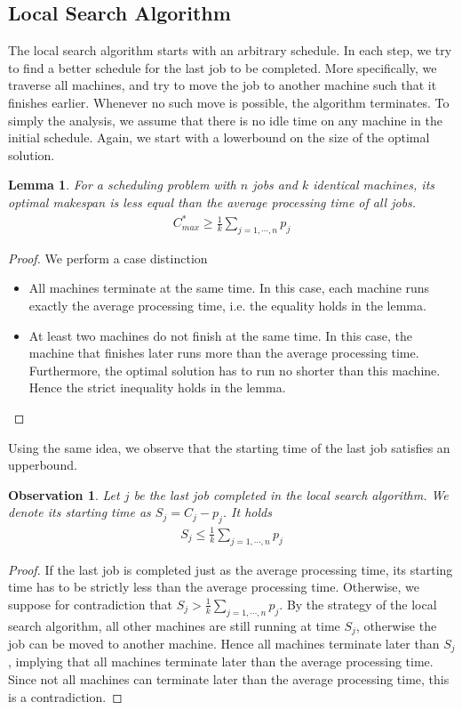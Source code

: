 \documentclass[11pt,psfig,times]{article}
\newtheorem{lemma}[theorem]{Lemma}
\newtheorem{observation}[theorem]{Observation}
\begin{document}
\subsection{Local Search Algorithm}
The local search algorithm starts with an arbitrary schedule. In each step, we try to find a better schedule for the last job to be completed. 
More specifically, we traverse all machines, and try to move the job to another machine such that it finishes earlier. 
Whenever no such move is possible, the algorithm terminates. To simply the analysis, we assume that there is no idle time on any machine in the initial schedule.  
Again, we start with a lowerbound on the size of the optimal solution. 
\begin{lemma}
    \label{lemma:lowerbound2}
    For a scheduling problem with $n$ jobs and $k$ identical machines, its optimal makespan is less equal than the average processing time of all jobs.
    \begin{align*}
        C_{max}^* \geq \frac{1}{k} \sum_{j=1, \cdots, n} p_j
    \end{align*} 
\end{lemma}
\begin{proof}
    We perform a case distinction
    \begin{itemize}
        \item All machines terminate at the same time. In this case, each machine runs exactly the average processing time, i.e. the equality holds in the lemma. 
        \item At least two machines do not finish at the same time. In this case, the machine that finishes later runs more than the average processing time. Furthermore, the optimal solution has to run no shorter than this machine. 
        Hence the strict inequality holds in the lemma.
    \end{itemize}
\end{proof}
Using the same idea, we observe that the starting time of the last job satisfies an upperbound. 
\begin{observation}
    \label{observation:upperbound}
    Let $j$ be the last job completed in the local search algorithm. We denote its starting time as $S_j = C_j - p_j$. It holds 
    \begin{align*}
        S_j \leq \frac{1}{k} \sum_{j=1, \cdots, n} p_j
    \end{align*}
\end{observation}
\begin{proof}
    If the last job is completed just as the average processing time, its starting time has to be strictly less than the average processing time. 
    Otherwise, we suppose for contradiction that $S_j > \frac{1}{k} \sum_{j=1, \cdots, n} p_j$. By the strategy of the local search algorithm,
    all other machines are still running at time $S_j$, otherwise the job can be moved to another machine. Hence all machines terminate 
    later than $S_j$, implying that all machines terminate later than the average processing time. Since not all machines can terminate later than 
    the average processing time, this is a contradiction. 
\end{proof}
\end{document}
